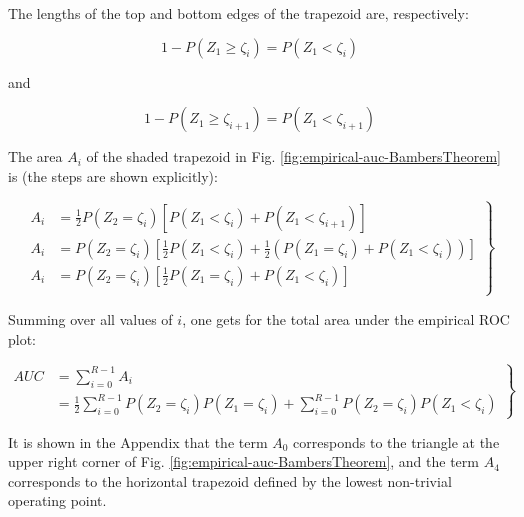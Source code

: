 \documentclass[
]{book}
\begin{document}
The lengths of the top and bottom edges of the trapezoid are, respectively:

\begin{equation}
1-P\left ( Z_1 \geq \zeta_i \right )=P\left ( Z_1 < \zeta_i \right )
\label{eq:empirical-auc-BambersTheoremProof3}
\end{equation}

and

\begin{equation}
1-P\left ( Z_1 \geq \zeta_{i+1} \right )=P\left ( Z_1 < \zeta_{i+1} \right )
\label{eq:empirical-auc-BambersTheoremProof4}
\end{equation}

The area \(A_i\) of the shaded trapezoid in Fig. \ref{fig:empirical-auc-BambersTheorem} is (the steps are shown explicitly):

\begin{equation}
\left.
\begin{aligned}
A_i &=\frac{1}{2}P\left ( Z_2 = \zeta_i \right )\left [ P\left ( Z_1 < \zeta_i \right ) +  P\left ( Z_1 < \zeta_{i+1} \right ) \right ] \\
A_i &=P\left ( Z_2 = \zeta_i \right )\left [ \frac{1}{2}P\left ( Z_1 < \zeta_i \right ) +  \frac{1}{2} \left (P\left ( Z_1 = \zeta_i \right ) + P\left ( Z_1 < \zeta_i \right ) \right ) \right ]\\
A_i &=P\left ( Z_2 = \zeta_i \right )\left [ \frac{1}{2} P\left ( Z_1 = \zeta_i \right ) +  P\left ( Z_1 < \zeta_i \right ) \right ] \\
\end{aligned}
\right \}
\label{eq:empirical-auc-BambersTheoremProof5}
\end{equation}

Summing over all values of \(i\), one gets for the total area under the empirical ROC plot:

\begin{equation}
\left.
\begin{aligned}
AUC & = \sum_{i=0}^{R-1}A_i\\
 & = \frac{1}{2}\sum_{i=0}^{R-1}P\left ( Z_2=\zeta_i \right )P\left ( Z_1=\zeta_i \right )+\sum_{i=0}^{R-1}P\left ( Z_2=\zeta_i \right )P\left ( Z_1<\zeta_i \right )
\end{aligned}
\right \}
\label{eq:empirical-auc-BambersTheoremProof6}
\end{equation}

It is shown in the Appendix that the term \(A_0\) corresponds to the triangle at the upper right corner of Fig. \ref{fig:empirical-auc-BambersTheorem}, and the term \(A_4\) corresponds to the horizontal trapezoid defined by the lowest non-trivial operating point.
\end{document}
